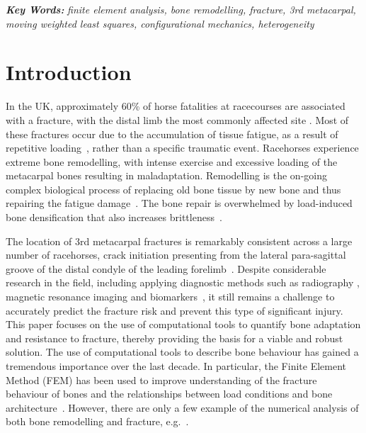 \documentclass[11pt]{acmeArticle}
\numberwithin{equation}{section}
\begin{document}
{\textbf{\textit{Key Words:}} {\it finite element analysis, bone remodelling, fracture, 3rd metacarpal, moving weighted least squares, configurational mechanics, heterogeneity}}
%
\\
\newpage
\clearpage
{}



\section{Introduction}
In the UK, approximately 60\% of horse fatalities at racecourses are associated with a fracture, with the distal limb the most commonly affected site \citep{parkin2004horse}.
Most of these fractures occur due to the accumulation of tissue fatigue, as a result of repetitive loading~\citep{Parkin2005}, rather than a specific traumatic event. 
Racehorses experience extreme bone remodelling, with intense exercise and excessive loading of the metacarpal bones resulting in maladaptation. Remodelling is the on-going complex biological process of replacing old bone tissue by new bone and thus repairing the fatigue damage~\citep{hughes2017role}.
The bone repair is overwhelmed by load-induced bone densification that also increases brittleness~\citep{loughridge2017qualitative}.

The location of 3rd metacarpal fractures is remarkably consistent across a large number of racehorses,  crack initiation presenting from 
the lateral para-sagittal groove of the distal condyle of the leading forelimb~\citep{jacklin2012frequency, parkin2006analysis}.
Despite considerable research in the field, including applying diagnostic methods such as radiography 
\citep{bogers2016quantitative, crijns2014intramodality, loughridge2017qualitative}, magnetic resonance imaging 
\citep{tranquille2017MRI} and biomarkers~\citep{mcilwraith2005use}, it still remains a challenge to accurately predict the fracture risk 
and prevent this type of significant injury.
This paper focuses on the use of computational tools to quantify bone adaptation and resistance to fracture, thereby providing the basis for a 
viable and robust solution.
The use of computational tools to describe bone behaviour has gained a tremendous importance over the last decade. 
In particular, the Finite Element Method (FEM) has been used to improve understanding of the fracture behaviour of bones and the relationships between load conditions and bone architecture~\citep{podshivalov2014road, poelert2013patient}. However, there are only a few example of the numerical analysis of both bone remodelling and fracture, e.g.~\citep{hambli2013integrated}.
\end{document}
